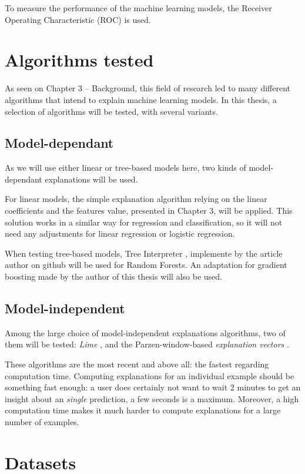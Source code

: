 \documentclass[a4paper,11pt]{kth-mag}
\begin{document}
To measure the performance of the machine learning models, the Receiver Operating Characteristic (ROC) is used.

\section{Algorithms tested}

As seen on Chapter 3 -- Background, this field of research led to many different algorithms that intend to explain machine learning models. In this thesis, a selection of algorithms will be tested, with several variants.

\subsection{Model-dependant}

As we will use either linear or tree-based models here, two kinds of model-dependant explanations will be used.

For linear models, the simple explanation algorithm relying on the linear coefficients and the features value, presented in Chapter 3, will be applied. This solution works in a similar way for regression and classification, so it will not need any adjustments for linear regression or logistic regression.

When testing tree-based models, Tree Interpreter \cite{treeinterpreter}, implemente by the article author on github will be used for Random Forests. An adaptation for gradient boosting made by the author of this thesis will also be used.

\subsection{Model-independent}

Among the large choice of model-independent explanations algorithms, two of them will be tested: \textit{Lime} \cite{lime}, and the Parzen-window-based \textit{explanation vectors} \cite{explvect}.

These algorithms are the most recent and above all: the fastest regarding computation time. Computing explanations for an individual example should be something fast enough: a user does certainly not want to wait 2 minutes to get an insight about an \textit{single} prediction, a few seconds is a maximum. Moreover, a high computation time makes it much harder to compute explanations for a large number of examples.

\section{Datasets}
\end{document}
